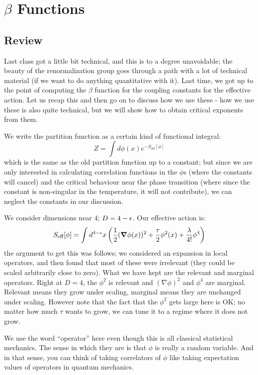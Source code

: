 \section{$\beta$ Functions}
\subsection{Review}
Last class got a little bit technical, and this is to a degree unavoidable; the beauty of the renormalization group goes through a path with a lot of technical material (if we want to do anything quantitative with it). Last time, we got up to the point of computing the $\beta$ function for the coupling constants for the effective action. Let us recap this and then go on to discuss how we use these - how we use these is also quite technical, but we will show how to obtain critical exponents from them.

We write the partition function as a certain kind of functional integral:
\begin{equation}
    Z = \int d\phi(x)e^{-S_{\text{eff}}[\phi]}
\end{equation}
which is the same as the old partition function up to a constant; but since we are only interested in calculating correlation functions in the $\phi$s (where the constants will cancel) and the critical behaviour near the phase transition (where since the constant is non-singular in the temperature, it will not contribute), we can neglect the constants in our discussion.

We consider dimensions near 4; $D = 4 - \epsilon$. Our effective action is:
\begin{equation}\label{eq-oldtheory}
    S_{\text{eff}}[\phi] = \int d^{4-\e}x \left(\frac{1}{2}(\nabla \phi(x))^2 + \frac{\tau}{2}\phi^2(x) + \frac{\lambda}{4!}\phi^4\right)
\end{equation}
the argument to get this was follows; we considered an expansion in local operators, and then found that most of these were irrelevant (they could be scaled arbitrarily close to zero). What we have kept are the relevant and marginal operators. Right at $D = 4$, the $\phi^2$ is relevant and $(\nabla \phi)^2$ and $\phi^4$ are marginal. Relevant means they grow under scaling, marginal means they are unchanged under scaling. However note that the fact that the $\phi^2$ gets large here is OK; no matter how much $\tau$ wants to grow, we can tune it to a regime where it does not grow.

We use the word ``operator'' here even though this is all classical statistical mechanics. The sense in which they are is that $\phi$ is really a random variable. And in that sense, you can think of taking correlators of $\phi$ like taking expectation values of operators in quantum mechanics. 

